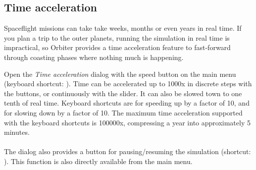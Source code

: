 \documentclass[Orbiter User Manual.tex]{subfiles}
\begin{document}
\subsection{Time acceleration}
\label{ssec:menu_time}
Spaceflight missions can take take weeks, months or even years in real time. If you plan a trip to the outer planets, running the simulation in real time is impractical, so Orbiter provides a time acceleration feature to fast-forward through coasting phases where nothing much is happening.

\begin{figure}[H]
	\centering
\end{figure}

\noindent
Open the \textit{Time acceleration} dialog with the speed button on the main menu (keyboard shortcut: \Ctrl{}). Time can be accelerated up to 1000x in discrete steps with the buttons, or continuously with the slider. It can also be slowed town to one tenth of real time. Keyboard shortcuts are  for speeding up by a factor of 10, and  for slowing down by a factor of 10. The maximum time acceleration supported with the keyboard shortcuts is 100000x, compressing a year into approximately 5 minutes.
\\
\noindent
\\
The dialog also provides a button for pausing/resuming the simulation (shortcut: \Ctrl{}). This function is also directly available from the main menu.
\end{document}
